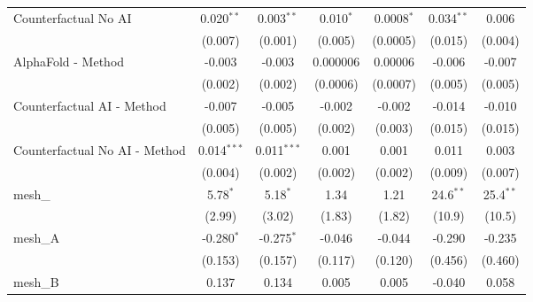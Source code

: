 \begin{tabular}{lcccccc}
   Counterfactual No AI                                        & 0.020$^{**}$   & 0.003$^{**}$   & 0.010$^{*}$    & 0.0008$^{*}$    & 0.034$^{**}$ & 0.006\\   
                                                               & (0.007)        & (0.001)        & (0.005)        & (0.0005)        & (0.015)      & (0.004)\\   
   AlphaFold - Method                                          & -0.003         & -0.003         & 0.000006       & 0.00006         & -0.006       & -0.007\\   
                                                               & (0.002)        & (0.002)        & (0.0006)       & (0.0007)        & (0.005)      & (0.005)\\   
   Counterfactual AI - Method                                  & -0.007         & -0.005         & -0.002         & -0.002          & -0.014       & -0.010\\   
                                                               & (0.005)        & (0.005)        & (0.002)        & (0.003)         & (0.015)      & (0.015)\\   
   Counterfactual No AI - Method                               & 0.014$^{***}$  & 0.011$^{***}$  & 0.001          & 0.001           & 0.011        & 0.003\\   
                                                               & (0.004)        & (0.002)        & (0.002)        & (0.002)         & (0.009)      & (0.007)\\   
   mesh\_                                                      & 5.78$^{*}$     & 5.18$^{*}$     & 1.34           & 1.21            & 24.6$^{**}$  & 25.4$^{**}$\\   
                                                               & (2.99)         & (3.02)         & (1.83)         & (1.82)          & (10.9)       & (10.5)\\   
   mesh\_A                                                     & -0.280$^{*}$   & -0.275$^{*}$   & -0.046         & -0.044          & -0.290       & -0.235\\   
                                                               & (0.153)        & (0.157)        & (0.117)        & (0.120)         & (0.456)      & (0.460)\\   
   mesh\_B                                                     & 0.137          & 0.134          & 0.005          & 0.005           & -0.040       & 0.058\\   

\end{tabular}
